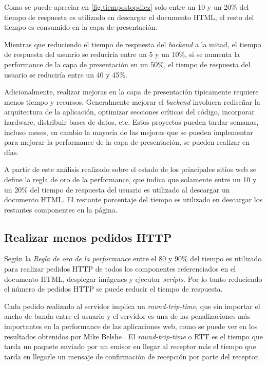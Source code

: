 Como se puede apreciar en \ref{fig.tiempostopdiez} solo entre un 10 y un 20\% del tiempo de respuesta es utilizado en descargar el documento HTML, el resto
del tiempo es consumido en la capa de presentación.

Mientras que reduciendo el tiempo de respuesta del \emph{backend} a la mitad, el tiempo de respuesta del usuario se reduciría entre un 5 y un 10\%, si se aumenta la performance de la capa de presentación en un 50\%, el tiempo de respuesta del usuario se reduciría entre un 40 y 45\%.

Adicionalmente, realizar mejoras en la capa de presentación típicamente requiere menos tiempo y recursos. Generalmente mejorar el \emph{backend} involucra rediseñar la arquitectura de la aplicación, optimizar secciones críticas del código, incorporar hardware, distribuir bases de datos, etc. Estos proyectos pueden tardar semanas, incluso meses, en cambio la
mayoría de las mejoras que se pueden implementar para mejorar la performance de la capa de presentación, se pueden realizar en días.

A partir de este análisis realizado sobre el estado de los principales sitios web se define la regla de oro de la performance, que indica que solamente entre un 10 y un 20\% 
del tiempo de respuesta del usuario es utilizado al descargar un documento HTML. El restante porcentaje del tiempo es utilizado en descargar los restantes componentes
en la página.

\subsection{Realizar menos pedidos HTTP}
\label{cap3:reglas:menos_pedidos}

Según la \emph{Regla de oro de la performance} entre el 80 y 90\% del tiempo es utilizado para realizar pedidos HTTP de todos
los componentes referenciados en el documento HTML, desplegar imágenes y ejecutar \emph{scripts}. Por lo tanto reduciendo el número de pedidos HTTP se puede reducir el tiempo
de respuesta.

Cada pedido realizado al servidor implica un \emph{round-trip-time}, que sin importar el ancho de banda entre el usuario y el servidor es una de las penalizaciones más importantes
en la performance de las aplicaciones web, como se puede ver en los resultados obtenidos por Mike Belshe \cite{mike_belshe}. El \emph{round-trip-time} o RTT es el tiempo que
tarda un paquete enviado por un emisor en llegar al receptor más el tiempo que tarda en llegarle un mensaje de confirmación de recepción por parte del receptor.

